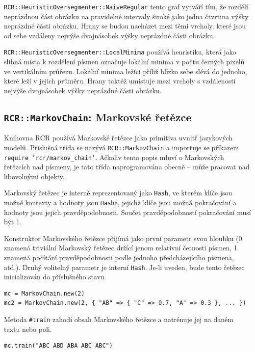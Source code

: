 \documentclass[a4paper]{article}
\begin{document}
\texttt{RCR::HeuristicOversegmenter::NaiveRegular} tento graf vytváří tím, že
rozdělí neprázdnou část obrázku na pravidelné intervaly široké jako jedna
čtvrtina výšky neprázdné části obrázku. Hrany se budou nacházet mezi těmi
vrcholy, které jsou od sebe vzdáleny nejvýše dvojnásobek výšky neprázdné části
obrázku.

\texttt{RCR::HeuristicOversegmenter::LocalMinima} používá heuristiku, která
jako slibná místa k rozdělení písmen označuje lokální minima v počtu
černých pixelů ve vertikálním průřezu. Lokální minima ležící příliž blízko
sebe slévá do jednoho, které leží v jejich průměru. Hrany taktéž umisťuje
mezi vrcholy s vzdáleností nejvýše dvojnásobek výšky neprázdné části obrázku.

\subsection{\texttt{RCR::MarkovChain}: Markovské řetězce}
Knihovna RCR používá Markovské řetězce jako primitiva uvnitř jazykových modelů.
Příslušná třída se nazývá \texttt{RCR::MarkovChain} a importuje se příkazem
\texttt{require 'rcr/markov\_chain'}. Ačkoliv tento popis mluví o Markovských
řetězcích nad písmeny, je tato třída naprogramována obecně -- může pracovat nad
libovolnými objekty.

Markovský řetězec je interně reprezentovaný jako \texttt{Hash}, ve kterém klíče
jsou možné kontexty a hodnoty jsou \texttt{Hash}e, jejichž klíče jsou možná
pokračování a hodnoty jsou jejich pravděpodobnosti. Součet pravděpodobností
pokračování musí být 1.

Konstruktor Markovského řetězce přijímá jako první parametr svou hloubku (0
znamená triviální Markovský řetězec držící jenom relativní četnosti písmen, 1
znamená počítání pravděpodobnosti podle jednoho předcházejícího písmena, atd.).
Druhý volitelný parametr je interní \texttt{Hash}. Je-li uveden, bude tento
řetězec inicializován do příslušného stavu.
\begin{lstlisting}
mc = MarkovChain.new(2)
mc2 = MarkovChain.new(2, { "AB" => { "C" => 0.7, "A" => 0.3 }, ... })
\end{lstlisting}

Metoda \texttt{\#train} zahodí obsah Markovského řetězce a natrénuje jej na
daném textu nebo poli.
\begin{lstlisting}
mc.train("ABC ABD ABA ABC ABC")
\end{lstlisting}
\end{document}
